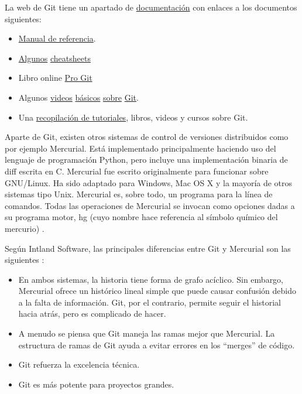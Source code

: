 La web de Git tiene un apartado de \href{https://git-scm.com/doc}{documentación} con enlaces a los documentos siguientes:
\begin{itemize}
    \item \href{https://git-scm.com/docs}{Manual de referencia}.
    \item \href{https://github.github.com/training-kit/}{Algunos} \href{https://ndpsoftware.com/git-cheatsheet.html}{cheatsheets}
    \item Libro online \href{https://git-scm.com/book/en/v2}{Pro Git}
    \item Algunos \href{https://git-scm.com/video/what-is-version-control}{videos} \href{https://git-scm.com/video/what-is-git}{básicos} \href{https://git-scm.com/video/get-going}{sobre} \href{https://git-scm.com/video/quick-wins}{Git}.
    \item Una \href{https://git-scm.com/doc/ext}{recopilación de tutoriales}, libros, videos y cursos sobre Git.
\end{itemize}

Aparte de Git, existen otros sistemas de control de versiones distribuidos como por ejemplo Mercurial. Está implementado principalmente haciendo uso del lenguaje de programación Python, pero incluye una implementación binaria de diff escrita en C. Mercurial fue escrito originalmente para funcionar sobre GNU/Linux. Ha sido adaptado para Windows, Mac OS X y la mayoría de otros sistemas tipo Unix. Mercurial es, sobre todo, un programa para la línea de comandos. Todas las operaciones de Mercurial se invocan como opciones dadas a su programa motor, hg (cuyo nombre hace referencia al símbolo químico del mercurio) \cite{wikipedia_2019:Mercurial}.

Según Intland Software, las principales diferencias entre Git y Mercurial son las siguientes \cite{intland_2015:Pros_Cons_Mercurial_Git}:
\begin{itemize}
    \item En ambos sistemas, la historia tiene forma de grafo acíclico. Sin embargo, Mercurial ofrece un histórico lineal simple que puede causar confusión debido a la falta de información. Git, por el contrario, permite seguir el historial hacia atrás, pero es complicado de hacer.
    \item A menudo se piensa que Git maneja las ramas mejor que Mercurial. La estructura de ramas de Git ayuda a evitar errores en los ``merges'' de código.
    \item Git refuerza la excelencia técnica.
    \item Git es más potente para proyectos grandes.
\end{itemize}

